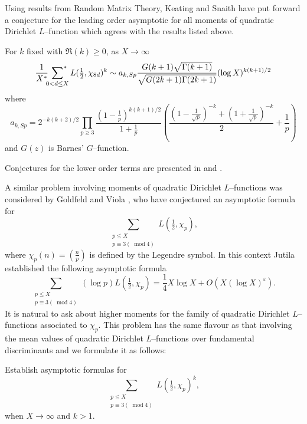 \documentclass[11pt]{amsart}
\begin{document}
Using results from Random Matrix Theory, Keating and Snaith \cite{KeS2} have put forward a conjecture for the leading order asymptotic for all moments of quadratic Dirichlet $L$--function which agrees with the results listed above.
\begin{conj}
For $k$ fixed with $\mathfrak{R}(k)\geq0$, as $X\rightarrow\infty$
\begin{equation}
\frac{1}{X^{*}}\sideset{}{^{*}}\sum_{0<d\leq X}L(\tfrac{1}{2},\chi_{8d})^{k}\sim a_{k,Sp}\frac{G(k+1)\sqrt{\Gamma(k+1)}}{\sqrt{G(2k+1)\Gamma(2k+1)}}(\log X)^{k(k+1)/2}
\end{equation}
where
$$a_{k,Sp}=2^{-k(k+2)/2}\prod_{p\geq3}\frac{(1-\frac{1}{p})^{k(k+1)/2}}{1+\frac{1}{p}}\left(\frac{(1-\frac{1}{\sqrt{p}})^{-k}+(1+\frac{1}{\sqrt{p}})^{-k}}{2}+\frac{1}{p}\right)$$
and $G(z)$ is Barnes' $G$--function.
\end{conj}
Conjectures for the lower order terms are presented in \cite{CFKRS} and \cite{DGH}.

A similar problem involving moments of quadratic Dirichlet $L$--functions was considered by Goldfeld and Viola \cite{GV}, who have conjectured an asymptotic formula for
\begin{equation}
\sum_{\substack{p\leq X \\ p\equiv3({\;\operatorname{mod}}4)}}L(\tfrac{1}{2},\chi_{p}),
\end{equation}
where $\chi_{p}(n)=\left(\frac{n}{p}\right)$ is defined by the Legendre symbol. In this context Jutila \cite{J} established the following asymptotic formula
\begin{equation}
\label{jutilaprime}
\sum_{\substack{p\leq X \\ p\equiv3({\;\operatorname{mod}}4)}}(\log p)L(\tfrac{1}{2},\chi_{p})=\frac{1}{4}X\log X+O(X(\log X)^{\varepsilon}).
\end{equation}  
It is natural to ask about higher moments for the family of quadratic Dirichlet $L$--functions associated to $\chi_{p}$. This problem has the same flavour as that involving the mean values of quadratic Dirichlet $L$--functions over fundamental discriminants and we formulate it as follows:
\begin{problem}
\label{prob1}
Establish asymptotic formulas for
\begin{equation}
\label{1.9}
\sum_{\substack{p\leq X \\ p\equiv3({\;\operatorname{mod}}4)}}L(\tfrac{1}{2},\chi_{p})^{k},
\end{equation} 
when $X\rightarrow\infty$ and $k>1$.
\end{problem}
\end{document}
